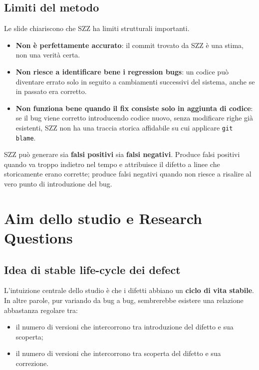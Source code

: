 \subsection{Limiti del metodo}

Le slide chiariscono che SZZ ha limiti strutturali importanti.

\begin{itemize}
    \item \textbf{Non è perfettamente accurato}: il commit trovato da SZZ è una stima, non una verità certa.
    \item \textbf{Non riesce a identificare bene i regression bugs}: un codice può diventare errato solo in seguito a cambiamenti successivi del sistema, anche se in passato era corretto.
    \item \textbf{Non funziona bene quando il fix consiste solo in aggiunta di codice}: se il bug viene corretto introducendo codice nuovo, senza modificare righe già esistenti, SZZ non ha una traccia storica affidabile su cui applicare \texttt{git blame}.
\end{itemize}

\begin{notaprof}
SZZ può generare sia \textbf{falsi positivi} sia \textbf{falsi negativi}. Produce falsi positivi quando va troppo indietro nel tempo e attribuisce il difetto a linee che storicamente erano corrette; produce falsi negativi quando non riesce a risalire al vero punto di introduzione del bug.
\end{notaprof}

\section{Aim dello studio e Research Questions}

\subsection{Idea di stable life-cycle dei defect}

L'intuizione centrale dello studio è che i difetti abbiano un \textbf{ciclo di vita stabile}. In altre parole, pur variando da bug a bug, sembrerebbe esistere una relazione abbastanza regolare tra:

\begin{itemize}
    \item il numero di versioni che intercorrono tra introduzione del difetto e sua scoperta;
    \item il numero di versioni che intercorrono tra scoperta del difetto e sua correzione.
\end{itemize}


